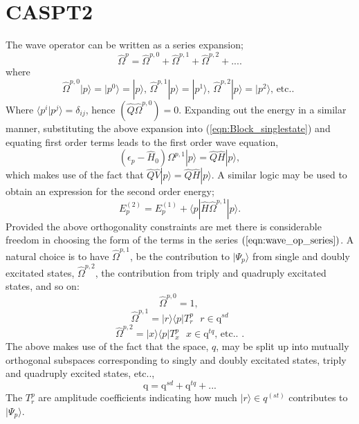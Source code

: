 \documentclass[12pt]{article}
\begin{document}
\section{ CASPT2 }
\noindent The wave operator can be written as a series expansion;
\begin{equation}
\hat{\Omega}^{p} = \hat{\Omega}^{p,0}+\hat{\Omega}^{p,1}+\hat{\Omega}^{p,2}+....
\end{equation} 
where 
\begin{equation}
\hat{\Omega}^{p,0}|p\rangle = |p^{0}\rangle = |p\rangle \text{, \ \  }
\hat{\Omega}^{p,1}|p\rangle = |p^{1}\rangle \text{, \ \ }
\hat{\Omega}^{p,2}|p\rangle = |p^{2}\rangle \text{, \  etc.. }
\label{eqn:wave_op_series}
\end{equation} 
Where  $\langle p^{i} | p^{j} \rangle=  \delta_{ij}$,  hence $(\hat{Q}\hat{\Omega}^{p,0}) = 0$.
Expanding out the energy in a similar manner,
substituting the above expansion into (\ref{eqn:Block_singlestate}) and equating first order terms leads to the first order
wave equation,
\begin{equation}
(\epsilon_{p} - \hat{H}_{0} )\Omega^{p,1}|p\rangle = \hat{Q}\hat{H}|p\rangle ,
\label{eqn:Bloch_singlestate_firstorder}
\end{equation}
which makes use of the fact that $ \hat{Q}\hat{V}|p\rangle= \hat{Q}\hat{H}|p\rangle$. A similar logic may be
used to obtain an expression for the second order energy;
\begin{equation}
E_{p}^{(2)} = E_{p}^{(1)} + \langle p | \hat{H} \hat{\Omega}^{p,1}| p \rangle .
\end{equation}
Provided the above orthogonality constraints are met there is considerable freedom in choosing the form of the terms in the
series $(\ref{eqn:wave_op_series})$.  A natural choice is to have $\hat{\Omega}^{p,1}$, be the contribution
to $|\Psi_{p}\rangle$ from single and doubly excitated states, $\hat{\Omega}^{p,2}$,  the contribution from triply
and quadruply excitated states, and so on:
\begin{equation*}
\hat{\Omega}^{p,0} = 1 \text{, \ \  }
\end{equation*}
\begin{equation*}
\hat{\Omega}^{p,1} = | r \rangle \langle p | T^{p}_{r} \text{ \ \ \ } r \in \mathrm{q}^{sd} 
\end{equation*}
\begin{equation*}
\hat{\Omega}^{p,2} = | x \rangle \langle p | T^{p}_{x} \text{ \ \ \ } x \in \mathrm{q}^{tq}  \text{, \  etc.. }.
\end{equation*}
The above makes use of the fact that the space, $q$, may be split up into mutually orthogonal 
subspaces corresponding to singly and doubly excitated states, triply and quadruply excited states, etc..,
\begin{equation}
\mathrm{q} = \mathrm{q}^{sd} + \mathrm{q}^{tq} + ...
\end{equation}
The $T^{p}_{r}$ are amplitude coefficients indicating how much $|r\rangle \in q^{(st)}$
contributes to $|\Psi_{p}\rangle$.\\
\end{document}
